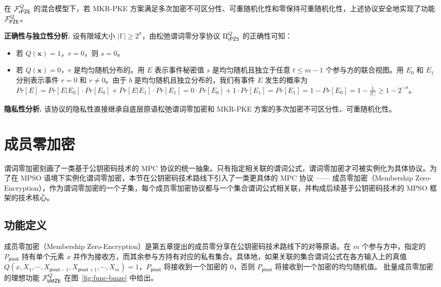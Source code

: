 \begin{theorem} \label{theorem:bssPMT}
在 $\mathcal{F}_\mathsf{rPZE}^Q$ 的混合模型下，若 MKR-PKE 方案满足多次加密不可区分性、可重随机化性和零保持可重随机化性，上述协议安全地实现了功能 $\mathcal{F}_\mathsf{PZE}^Q$。
\end{theorem}

\begin{trivlist}
\item \textbf{正确性与独立性分析.} 设有限域大小 $\lvert \mathbb{F} \rvert \ge 2^\sigma$，由松弛谓词零分享协议 $\Pi_\mathsf{rPZS}^Q$ 的正确性可知：
\begin{itemize}[itemsep=2pt,topsep=5pt,parsep=0pt,leftmargin=10pt]
    \item 若 $Q(\textbf{x}) = 1$，$r = 0$，则 $s = 0$。
    \item 若 $Q(\textbf{x}) = 0$，$r$ 是均匀随机分布的。用 $E$ 表示事件秘密值 $s$ 是均匀随机且独立于任意 $t \le m-1$ 个参与方的联合视图。用 $E_0$ 和 $E_1$ 分别表示事件 $r = 0$ 和 $r \ne 0$。由于 $b$ 是均匀随机且独立分布的，我们有事件 $E$ 发生的概率为 $Pr[E] = Pr[E \vert E_0] \cdot Pr[E_0] + Pr[E \vert E_1] \cdot Pr[E_1] = 0 \cdot Pr[E_0] + 1 \cdot Pr[E_1] = Pr[E_1] = 1 - Pr[E_0] = 1 - \frac{1}{\lvert \mathbb{F} \rvert} \ge 1- 2^{-\sigma}$。
\end{itemize}
\item \textbf{隐私性分析.} 该协议的隐私性直接继承自底层原语松弛谓词零加密和 MKR-PKE 方案的多次加密不可区分性、可重随机化性。
\end{trivlist}

\section{成员零加密}

谓词零加密刻画了一类基于公钥密码技术的 MPC 协议的统一抽象。只有指定相关联的谓词公式，谓词零加密才可被实例化为具体协议。为了在 MPSO 语境下实例化谓词零加密，本节在公钥密码技术路线下引入了一类更具体的 MPC 协议 —— 成员零加密（Membership Zero-Encryption），作为谓词零加密的一个子集，每个成员零加密协议都与一个集合谓词公式相关联，并构成后续基于公钥密码技术的 MPSO 框架的技术核心。

\subsection{功能定义}\label{sec:mze}

成员零加密（Membership Zero-Encryption）是第五章提出的成员零分享在公钥密码技术路线下的对等原语。在 $m$ 个参与方中，指定的 $P_\mathsf{pivot}$ 持有单个元素 $x$ 并作为接收方，而其余参与方持有对应的私有集合。具体地，如果关联的集合谓词公式在各方输入上的真值 $Q(x,X_1,\cdots,X_{\mathsf{pivot}-1},X_{\mathsf{pivot}+1},\cdots, X_m) = 1$，$P_\mathsf{pivot}$ 将接收到一个加密的 0，否则 $P_\mathsf{pivot}$ 将接收到一个加密的均匀随机值。 
批量成员零加密的理想功能 $\mathcal{F}_\mathsf{bMZE}^Q$ 在图~\ref{fig:func-bmze} 中给出。

